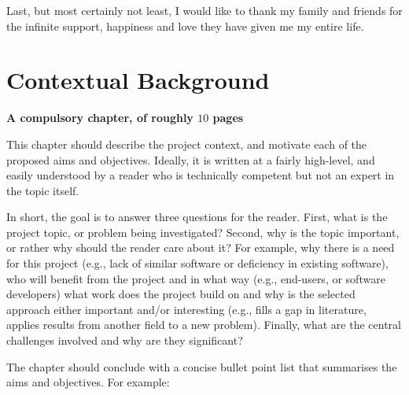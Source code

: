 \documentclass[ %
                    author={Dominic Joseph Moylett},
                supervisor={Dr. Raphael Clifford and Dr. Benjamin Sach},
                    degree={MEng},
                     title={Dictionary Matching with Fingerprints},
                  subtitle={An Empirical Analysis},
                      type={Research},
                      year={2014} ]{dissertation}
\begin{document}
Last, but most certainly not least, I would like to thank my family and friends for the infinite support, happiness and love they have given me my entire life.


%

\mainmatter


\chapter{Contextual Background}
\label{chap:context}

{\bf A compulsory chapter, of roughly $10$ pages}
\vspace{1cm} 

\noindent
This chapter should describe the project context, and motivate each of
the proposed aims and objectives.  Ideally, it is written at a fairly 
high-level, and easily understood by a reader who is technically 
competent but not an expert in the topic itself.

In short, the goal is to answer three questions for the reader.  First, 
what is the project topic, or problem being investigated?  Second, why 
is the topic important, or rather why should the reader care about it?  
For example, why there is a need for this project (e.g., lack of similar 
software or deficiency in existing software), who will benefit from the 
project and in what way (e.g., end-users, or software developers) what 
work does the project build on and why is the selected approach either
important and/or interesting (e.g., fills a gap in literature, applies
results from another field to a new problem).  Finally, what are the 
central challenges involved and why are they significant? 
 
The chapter should conclude with a concise bullet point list that 
summarises the aims and objectives.  For example:
\end{document}
